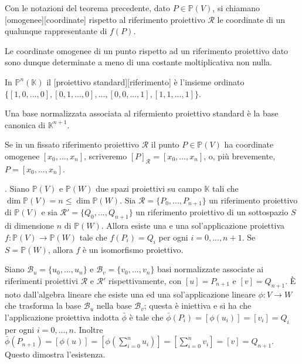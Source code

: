 \begin{Definition}\label{def17}
	Con le notazioni del teorema precedente, dato $P \in \mathbb{P}(V)$, si chiamano [omogenee][coordinate] rispetto al riferimento proiettivo $\mathcal{R}$ le coordinate di un qualunque rappresentante di $f(P)$.
\end{Definition}
\par Le coordinate omogenee di un punto rispetto ad un riferimento proiettivo dato sono dunque determinate a meno di una costante moltiplicativa non nulla.
\begin{Definition}\label{def18}
	In $\mathbb{P}^n(\mathbb{K})$ il [proiettivo standard][riferimento] \`e l'insieme ordinato $\lbrace [1, 0, ..., 0], [0, 1, ..., 0], ..., [0, 0, ..., 1], [1, 1, ..., 1] \rbrace$.
\end{Definition}
	\par Una base normalizzata associata al rifermiento proiettivo standard \`e la base canonica di $\mathbb{K}^{n + 1}$.
	\par Se in un fissato riferimento proiettivo $\mathcal{R}$ il punto $P \in \mathbb{P}(V)$ ha coordinate omogenee $[x_0, ..., x_n]$, scriveremo $[P]_{\mathcal{R}} = [x_0, ..., x_n]$, o, pi\`u brevemente, $P = [x_0, ..., x_n]$.
\begin{Theorem}\label{th16}
. Siano $\mathbb{P}(V)$ e $\mathbb{P}(W)$ due spazi proiettivi su campo $\mathbb{K}$ tali che $\dim \mathbb{P}(V) = n \leq \dim \mathbb{P}(W)$. Sia $\mathcal{R} = \lbrace P_0, ..., P_{n + 1} \rbrace$ un riferimento proiettivo di $\mathbb{P}(V)$ e sia $\mathcal{R}' = \lbrace Q_0, ..., Q_{n + 1} \rbrace$ un riferimento proiettivo di un sottospazio $S$ di dimensione $n$ di $\mathbb{P}(W)$. Allora esiste una e una sol'applicazione proiettiva $f: \mathbb{P}(V) \rightarrow \mathbb{P}(W)$ tale che $f(P_i) = Q_i$ per ogni $i = 0, ..., n + 1$. Se $S = \mathbb{P}(W)$, allora $f$ \`e un isomorfismo proiettivo.
\end{Theorem}
\Proof Siano $\mathcal{B}_u = \lbrace u_0, ..., u_n \rbrace$ e $\mathcal{B}_v = \lbrace v_0, ..., v_n \rbrace$ basi normalizzate associate ai riferimenti proiettivi $\mathcal{R}$ e $\mathcal{R}'$ rispettivamente, con $[u] = P_{n + 1}$ e $[v] = Q_{n + 1}$. \`E noto dall'algebra lineare che esiste una ed una sol'applicazione lineare $\phi: V \rightarrow W$ che trasforma la base $\mathcal{B}_u$ nella base $\mathcal{B}_v$; questa \`e iniettiva e si ha che l'applicazione proiettiva indotta $\bar{\phi}$ \`e tale che $\bar{\phi}(P_i) = [\phi(u_i)] = [v_i] = Q_i$ per ogni $i = 0, ..., n$. Inoltre $\bar{\phi}(P_{n + 1}) = [\phi(u)] = [\phi(\sum_{i = 0}^n u_i)] = [\sum_{i = 0}^n v_i] = [v] = Q_{n+ 1}$. Questo dimostra l'esistenza.
